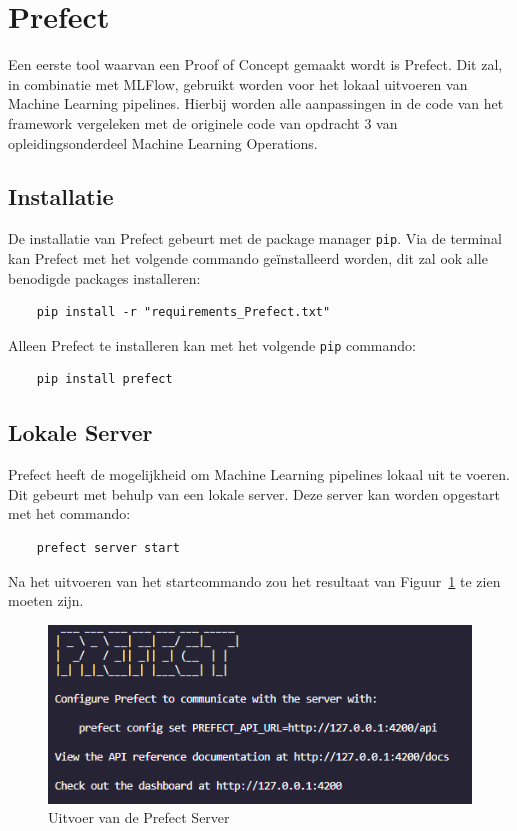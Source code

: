 \section{Prefect}

Een eerste tool waarvan een Proof of Concept gemaakt wordt is Prefect. Dit zal, in combinatie met MLFlow, gebruikt worden voor het lokaal uitvoeren van Machine Learning pipelines. Hierbij worden alle aanpassingen in de code van het framework vergeleken met de originele code van opdracht 3 van opleidingsonderdeel Machine Learning Operations.

\subsection{Installatie}

De installatie van Prefect gebeurt met de package manager \texttt{pip}. Via de terminal kan Prefect met het volgende commando geïnstalleerd worden, dit zal ook alle benodigde packages installeren:


\begin{verbatim}
    pip install -r "requirements_Prefect.txt"
\end{verbatim}

Alleen Prefect te installeren kan met het volgende \texttt{pip} commando:

\begin{verbatim}
    pip install prefect
\end{verbatim}

\subsection{Lokale Server}

Prefect heeft de mogelijkheid om Machine Learning pipelines lokaal uit te voeren. Dit gebeurt met behulp van een lokale server. Deze server kan worden opgestart met het commando:

\begin{verbatim}
    prefect server start
\end{verbatim}

Na het uitvoeren van het startcommando zou het resultaat van Figuur~\ref{fig:Prefect_server} te zien moeten zijn.
\begin{figure}[h]
    \centering
    \includegraphics[width=0.9\linewidth]{graphics/Prefect_server.PNG}
    \caption{Uitvoer van de Prefect Server}
    \label{fig:Prefect_server}
\end{figure}


